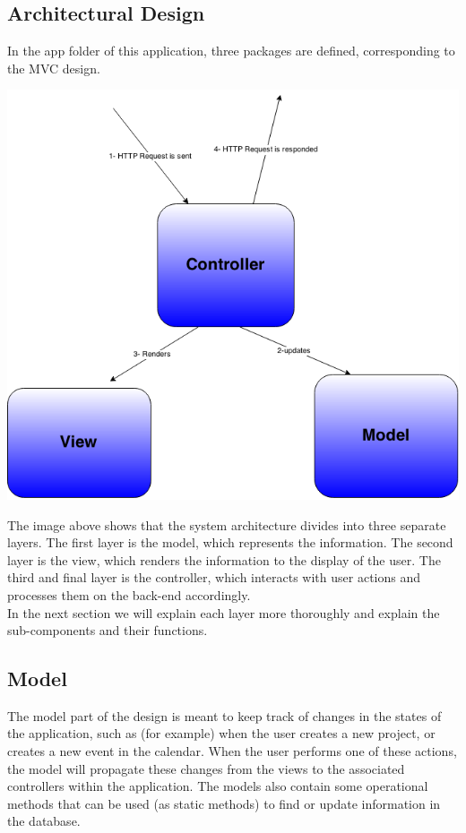 \subsection{Architectural Design} %
\label{sub:arichtectural_design}
%

In the app folder of this application, three packages are defined, corresponding to the MVC design. 
\begin{center}
\includegraphics[scale=0.3]{./img/dsgn_img/MVCdiag.png}
	
\end{center}

The image above shows that the system architecture divides into three separate layers. The first layer is the model, which represents the information. 
The second layer is the view, which renders the information to the display of the user. The third and final layer is the controller, which interacts 
with user actions and processes them on the back-end accordingly. \\
In the next section we will explain each layer more thoroughly and explain the sub-components and their functions. 

\subsection{Model} %
\label{sub:design_rationale}
The model part of the design is meant to keep track of changes in the states of the application, such as (for example) when the user creates a new
project, or creates a new event in the calendar. When the user performs one of these actions, the model will propagate these changes from the 
views to the associated controllers within the application. The models also contain some operational methods that can be used (as static methods) to 
find or update information in the database.

